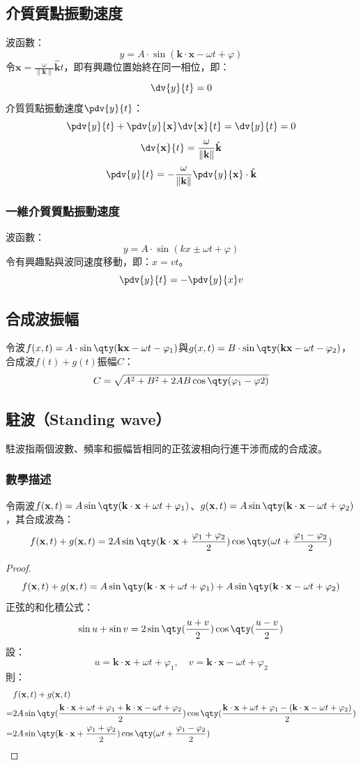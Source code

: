\documentclass[a4paper,12pt]{report}
\begin{document}
\subsection{介質質點振動速度}
波函數：
\[y=A\cdot\sin(\mathbf{k}\cdot\mathbf{x}-\omega t+\varphi)\]
令$\mathbf{x}=\frac{\omega}{\|\mathbf{k}\|}\hat{\mathbf{k}}t$，即有興趣位置始終在同一相位，即：
\[\dv{y}{t}=0\]
介質質點振動速度$\pdv{y}{t}$：
\[\pdv{y}{t}+\pdv{y}{\mathbf{x}}\dv{\mathbf{x}}{t}=\dv{y}{t}=0\]
\[\dv{\mathbf{x}}{t}=\frac{\omega}{\|\mathbf{k}\|}\hat{\mathbf{k}}\]
\[\pdv{y}{t}=-\frac{\omega}{\|\mathbf{k}\|}\pdv{y}{\mathbf{x}}\cdot\hat{\mathbf{k}}\]
\subsubsection{一維介質質點振動速度}
波函數：
\[y=A\cdot\sin(kx\pm\omega t+\varphi)\]
令有興趣點與波同速度移動，即：$x=vt$。
\[ \pdv{y}{t}=-\pdv{y}{x}v \]
\subsection{合成波振幅}
令波$f(x,t)=A\cdot\sin\qty(\mathbf{k}\mathbf{x}-\omega t-\varphi_1)$與$g(x,t)=B\cdot\sin\qty(\mathbf{k}\mathbf{x}-\omega t-\varphi_2)$，合成波$f(t)+g(t)$振幅$C$：
\[ C = \sqrt{A^2+B^2+2AB\cos\qty(\varphi_1-\varphi2)} \]
\subsection{駐波（Standing wave）}
駐波指兩個波數、頻率和振幅皆相同的正弦波相向行進干涉而成的合成波。
\subsubsection{數學描述}
令兩波$f(\mathbf{x},t)=A\sin\qty(\mathbf{k}\cdot\mathbf{x}+\omega t+\varphi_1)$、$g(\mathbf{x},t)=A\sin\qty(\mathbf{k}\cdot\mathbf{x}-\omega t+\varphi_2)$，其合成波為：
\[ f(\mathbf{x},t)+g(\mathbf{x},t) = 2A\sin\qty(\mathbf{k}\cdot\mathbf{x} + \frac{\varphi_1 + \varphi_2}{2})\cos\qty(\omega t + \frac{\varphi_1 - \varphi_2}{2}) \]
\begin{proof}
\[
f(\mathbf{x},t) + g(\mathbf{x},t) = A\sin\qty(\mathbf{k}\cdot\mathbf{x} + \omega t + \varphi_1) + A\sin\qty(\mathbf{k}\cdot\mathbf{x} - \omega t + \varphi_2)
\]
正弦的和化積公式：
\[
\sin{u} + \sin{v} = 2\sin\qty(\frac{u + v}{2})\cos\qty(\frac{u - v}{2})
\]
設：
\[
u = \mathbf{k}\cdot\mathbf{x} + \omega t + \varphi_1, \quad v = \mathbf{k}\cdot\mathbf{x} - \omega t + \varphi_2
\]
則：
\[\begin{aligned}
&f(\mathbf{x},t) + g(\mathbf{x},t) \\
=& 2A\sin\qty(\frac{\mathbf{k}\cdot\mathbf{x} + \omega t + \varphi_1 + \mathbf{k}\cdot\mathbf{x} - \omega t + \varphi_2}{2})\cos\qty(\frac{\mathbf{k}\cdot\mathbf{x} + \omega t + \varphi_1 - (\mathbf{k}\cdot\mathbf{x} - \omega t + \varphi_2)}{2})\\
=& 2A\sin\qty(\mathbf{k}\cdot\mathbf{x} + \frac{\varphi_1 + \varphi_2}{2})\cos\qty(\omega t + \frac{\varphi_1 - \varphi_2}{2})
\end{aligned}\]
\end{proof}
\end{document}
